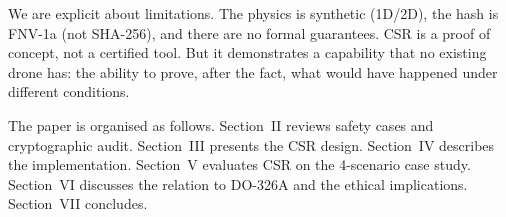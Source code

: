 We are explicit about limitations. The physics is synthetic
(1D/2D), the hash is FNV-1a (not SHA-256), and there are no formal
guarantees. CSR is a proof of concept, not a certified tool. But
it demonstrates a capability that no existing drone has: the ability
to prove, after the fact, what would have happened under different
conditions.

The paper is organised as follows. Section~II reviews safety cases
and cryptographic audit. Section~III presents the CSR design.
Section~IV describes the implementation. Section~V evaluates CSR
on the 4-scenario case study. Section~VI discusses the relation to
DO-326A and the ethical implications. Section~VII concludes.


